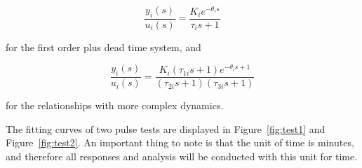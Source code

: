 \begin{equation}
	\frac{y_i(s)}{u_i(s)} = \frac{K_i e^{-\theta_is}}{\tau_i s + 1}
\end{equation}

for the first order plus dead time system, and 

\begin{equation}
	\frac{y_i(s)}{u_i(s)} = \frac{K_i (\tau_{1i}s + 1) e ^{-\theta_is +1}}{(\tau_{2i}s +1)(\tau_{3i}s +1)}
\end{equation}

for the relationships with more complex dynamics.

The fitting curves of two pulse tests are displayed in Figure~\ref{fig:test1} and Figure~\ref{fig:test2}. An important thing to note is that the unit of time is minutes, and therefore all responses and analysis will be conducted with this unit for time.

